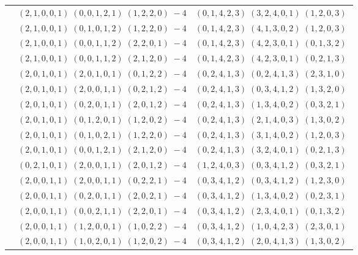 \documentclass[11pt]{article}
\begin{document}
\begin{longtable}[l]{|c|c|c|}
 \cline{2-3} 
 & $(2 ,1 ,0 ,0 ,1) \;(0 ,0 ,1 ,2 ,1) \;(1 ,2 ,2 ,0) \;-4$ & $(0 ,1 ,4 ,2 ,3) \;(3 ,2 ,4 ,0 ,1) \;(1 ,2 ,0 ,3) \;$\\ 
 \cline{2-3} 
 & $(2 ,1 ,0 ,0 ,1) \;(0 ,1 ,0 ,1 ,2) \;(1 ,2 ,2 ,0) \;-4$ & $(0 ,1 ,4 ,2 ,3) \;(4 ,1 ,3 ,0 ,2) \;(1 ,2 ,0 ,3) \;$\\ 
 \cline{2-3} 
 & $(2 ,1 ,0 ,0 ,1) \;(0 ,0 ,1 ,1 ,2) \;(2 ,2 ,0 ,1) \;-4$ & $(0 ,1 ,4 ,2 ,3) \;(4 ,2 ,3 ,0 ,1) \;(0 ,1 ,3 ,2) \;$\\ 
 \cline{2-3} 
 & $(2 ,1 ,0 ,0 ,1) \;(0 ,0 ,1 ,1 ,2) \;(2 ,1 ,2 ,0) \;-4$ & $(0 ,1 ,4 ,2 ,3) \;(4 ,2 ,3 ,0 ,1) \;(0 ,2 ,1 ,3) \;$\\ 
 \cline{2-3} 
 & $(2 ,0 ,1 ,0 ,1) \;(2 ,0 ,1 ,0 ,1) \;(0 ,1 ,2 ,2) \;-4$ & $(0 ,2 ,4 ,1 ,3) \;(0 ,2 ,4 ,1 ,3) \;(2 ,3 ,1 ,0) \;$\\ 
 \cline{2-3} 
 & $(2 ,0 ,1 ,0 ,1) \;(2 ,0 ,0 ,1 ,1) \;(0 ,2 ,1 ,2) \;-4$ & $(0 ,2 ,4 ,1 ,3) \;(0 ,3 ,4 ,1 ,2) \;(1 ,3 ,2 ,0) \;$\\ 
 \cline{2-3} 
 & $(2 ,0 ,1 ,0 ,1) \;(0 ,2 ,0 ,1 ,1) \;(2 ,0 ,1 ,2) \;-4$ & $(0 ,2 ,4 ,1 ,3) \;(1 ,3 ,4 ,0 ,2) \;(0 ,3 ,2 ,1) \;$\\ 
 \cline{2-3} 
 & $(2 ,0 ,1 ,0 ,1) \;(0 ,1 ,2 ,0 ,1) \;(1 ,2 ,0 ,2) \;-4$ & $(0 ,2 ,4 ,1 ,3) \;(2 ,1 ,4 ,0 ,3) \;(1 ,3 ,0 ,2) \;$\\ 
 \cline{2-3} 
 & $(2 ,0 ,1 ,0 ,1) \;(0 ,1 ,0 ,2 ,1) \;(1 ,2 ,2 ,0) \;-4$ & $(0 ,2 ,4 ,1 ,3) \;(3 ,1 ,4 ,0 ,2) \;(1 ,2 ,0 ,3) \;$\\ 
 \cline{2-3} 
 & $(2 ,0 ,1 ,0 ,1) \;(0 ,0 ,1 ,2 ,1) \;(2 ,1 ,2 ,0) \;-4$ & $(0 ,2 ,4 ,1 ,3) \;(3 ,2 ,4 ,0 ,1) \;(0 ,2 ,1 ,3) \;$\\ 
 \cline{2-3} 
 & $(0 ,2 ,1 ,0 ,1) \;(2 ,0 ,0 ,1 ,1) \;(2 ,0 ,1 ,2) \;-4$ & $(1 ,2 ,4 ,0 ,3) \;(0 ,3 ,4 ,1 ,2) \;(0 ,3 ,2 ,1) \;$\\ 
 \cline{2-3} 
 & $(2 ,0 ,0 ,1 ,1) \;(2 ,0 ,0 ,1 ,1) \;(0 ,2 ,2 ,1) \;-4$ & $(0 ,3 ,4 ,1 ,2) \;(0 ,3 ,4 ,1 ,2) \;(1 ,2 ,3 ,0) \;$\\ 
 \cline{2-3} 
 & $(2 ,0 ,0 ,1 ,1) \;(0 ,2 ,0 ,1 ,1) \;(2 ,0 ,2 ,1) \;-4$ & $(0 ,3 ,4 ,1 ,2) \;(1 ,3 ,4 ,0 ,2) \;(0 ,2 ,3 ,1) \;$\\ 
 \cline{2-3} 
 & $(2 ,0 ,0 ,1 ,1) \;(0 ,0 ,2 ,1 ,1) \;(2 ,2 ,0 ,1) \;-4$ & $(0 ,3 ,4 ,1 ,2) \;(2 ,3 ,4 ,0 ,1) \;(0 ,1 ,3 ,2) \;$\\ 
 \cline{2-3} 
 & $(2 ,0 ,0 ,1 ,1) \;(1 ,2 ,0 ,0 ,1) \;(1 ,0 ,2 ,2) \;-4$ & $(0 ,3 ,4 ,1 ,2) \;(1 ,0 ,4 ,2 ,3) \;(2 ,3 ,0 ,1) \;$\\ 
 \cline{2-3} 
 & $(2 ,0 ,0 ,1 ,1) \;(1 ,0 ,2 ,0 ,1) \;(1 ,2 ,0 ,2) \;-4$ & $(0 ,3 ,4 ,1 ,2) \;(2 ,0 ,4 ,1 ,3) \;(1 ,3 ,0 ,2) \;$\\ 

\end{longtable}
\end{document}
